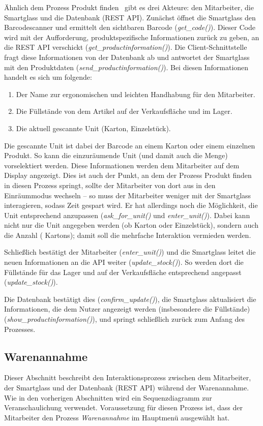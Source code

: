Ähnlich dem Prozess \glqq Produkt finden\grqq~ gibt es drei Akteure: den Mitarbeiter, die Smartglass und die Datenbank (REST API). Zunächst öffnet die Smartglass den Barcodescanner und ermittelt den sichtbaren Barcode (\emph{get\_code()}). Dieser Code wird mit der Aufforderung, produktspezifische Informationen zurück zu geben,  an die REST API verschickt (\emph{get\_productinformation()}). Die Client-Schnittstelle fragt diese Informationen von der Datenbank ab und antwortet der Smartglass mit den Produktdaten (\emph{send\_productinformation()}). Bei diesen Informationen handelt es sich um folgende: 
\begin{enumerate}
	\item Der Name zur ergonomischen und leichten Handhabung für den Mitarbeiter.
	\item Die Füllstände von dem Artikel auf der Verkaufsfläche und im  Lager.
	\item Die aktuell gescannte Unit (Karton, Einzelstück).
\end{enumerate}
Die gescannte Unit ist dabei der Barcode an einem Karton oder einem einzelnen Produkt. So kann die einzuräumende Unit (und damit auch die Menge) vorselektiert werden. Diese Informationen werden dem Mitarbeiter auf dem Display angezeigt. Dies ist auch der Punkt, an dem der Prozess \glqq Produkt finden\grqq~ in diesen Prozess springt, sollte der Mitarbeiter von dort aus in den Einräummodus wechseln -- so muss der Mitarbeiter weniger mit der Smartglass interagieren, sodass Zeit gespart wird. Er hat allerdings noch die Möglichkeit, die Unit entsprechend anzupassen (\emph{ask\_for\_unit()} und \emph{\emph{enter\_unit()}}). Dabei kann nicht nur die Unit angegeben werden (ob Karton oder Einzelstück), sondern auch die Anzahl ( Kartons); damit soll die mehrfache Interaktion vermieden werden. 

Schließlich bestätigt der Mitarbeiter (\emph{enter\_unit()}) und die Smartglass leitet die neuen Informationen an die API weiter (\emph{update\_stock()}). So werden dort die Füllstände für das Lager und auf der Verkaufsfläche entsprechend angepasst (\emph{update\_stock()}).

Die Datenbank bestätigt dies (\emph{confirm\_update()}), die Smartglass aktualisiert die Informationen, die dem Nutzer angezeigt werden (insbesondere die Füllstände) (\emph{show\_productinformation()}), und springt schließlich zurück zum Anfang des Prozesses. 


\subsection{Warenannahme}
Dieser Abschnitt beschreibt den Interaktionsprozess zwischen dem Mitarbeiter, der Smartglass und der Datenbank (REST API) während der Warenannahme. Wie in den vorherigen Abschnitten wird ein Sequenzdiagramm zur Veranschaulichung verwendet. Voraussetzung für diesen Prozess ist, dass der Mitarbeiter den Prozess \textit{Warenannahme} im Hauptmenü ausgewählt hat.\\

